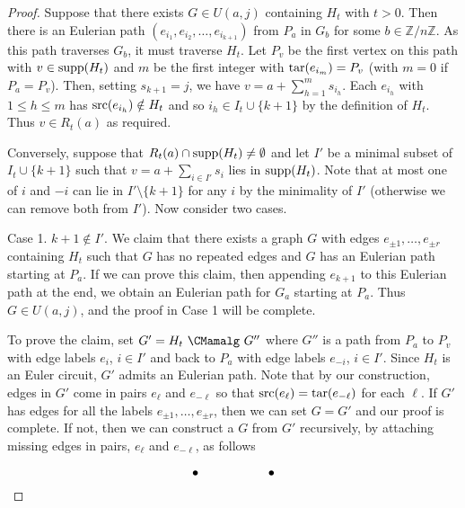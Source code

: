 \documentclass{amsproc}
\theoremstyle{definition}
\theoremstyle{remark}
\numberwithin{equation}{section}
\newcommand{\Z}{{\mathbb Z}}
\newcommand{\nodeDist}{2}
\newcommand{\supp}{{\rm supp}}
\newcommand{\src}{{\rm src}}
\newcommand{\tar}{{\rm tar}}
\begin{document}
\begin{proof}
Suppose that there exists $G\in U(a,j)$ containing $H_t$ with $t>0$. Then there is an Eulerian path $(e_{i_1},e_{i_2},\dots,e_{i_{k+1}})$ from $P_a$ in $G_b$ for some $b\in \Z/n\Z$. As this path traverses $G_b$, it must traverse $H_t$. Let $P_v$ be the first vertex on this path with $v\in\supp(H_t)$ and $m$ be the first integer with $\tar(e_{i_m})=P_v$ (with $m=0$ if $P_a=P_v$). Then, setting $s_{k+1}=j$, we have $v=a+\sum_{h=1}^m s_{i_h}$. Each $e_{i_h}$ with $1\leqslant h\leqslant m$ has $\src(e_{i_h})\notin H_t$ and so $i_h\in I_t\cup\{k+1\}$ by the definition of $H_t$. Thus $v\in R_t(a)$ as required.

Conversely, suppose that $R_t(a)\cap \supp(H_t)\neq \emptyset$ and let $I'$ be a minimal subset of $I_t\cup\{k+1\}$ such that $v=a+\sum_{i\in I'}s_i$ lies in $\supp(H_t)$. Note that at most one of $i$ and $-i$ can lie in $I'\setminus\{k+1\}$ for any $i$ by the minimality of $I'$ (otherwise we can remove both from $I'$). Now consider two cases.

\smallskip
Case 1. $k + 1 \not \in I'$. We claim that there exists a graph $G$ with edges $e_{\pm 1}, \ldots, e_{\pm r}$ containing $H_t$ such that
$G$ has no repeated edges and $G$ has an Eulerian path starting at $P_a$. If we can prove this claim, then appending $e_{k+1}$ to 
this Eulerian path at the end, we obtain an Eulerian path for $G_{a}$ starting at $P_a$. Thus $G \in U(a, j)$, and the proof in Case 1 will be complete.

To prove the claim, 
set $G'=H_t\ \CMamalg\ G''$ where $G''$ is a path from $P_a$ to $P_v$ with edge labels $e_{i}$, $i \in I'$ 
and back to $P_{a}$ with edge labels $e_{-i}$, $i \in I'$.
Since $H_t$ is an Euler circuit, $G'$ admits an Eulerian path. Note that
by our construction, edges in $G'$ come in pairs $e_{\ell}$ and $e_{-\ell}$ so that $\src(e_{\ell}) = \tar(e_{-\ell})$ for each $\ell$.
If $G'$ has edges for all the labels $e_{\pm 1},\dots,e_{\pm r}$, then we can set $G = G'$ and our proof is complete. 
If not, then we can construct a $G$ from $G'$ recursively, by attaching missing edges in pairs, $e_{\ell}$ and $e_{-\ell}$, as follows
\[
\begin{tikzpicture}[baseline,vertex/.style={anchor=base, circle, fill,minimum size=4pt, inner sep=0pt, outer sep=0pt},auto,
                               edge/.style={->,>=latex, shorten > = 5pt,shorten < = 5pt},
position/.style args={#1:#2 from #3}{
    at=(#3.#1), anchor=#1+180, shift=(#1:#2)
}]
  \node[vertex] (v1) {};
  \node[vertex,position = 0:{\nodeDist} from v1] (v2) {};


\end{tikzpicture}\]
\end{proof}
\end{document}
